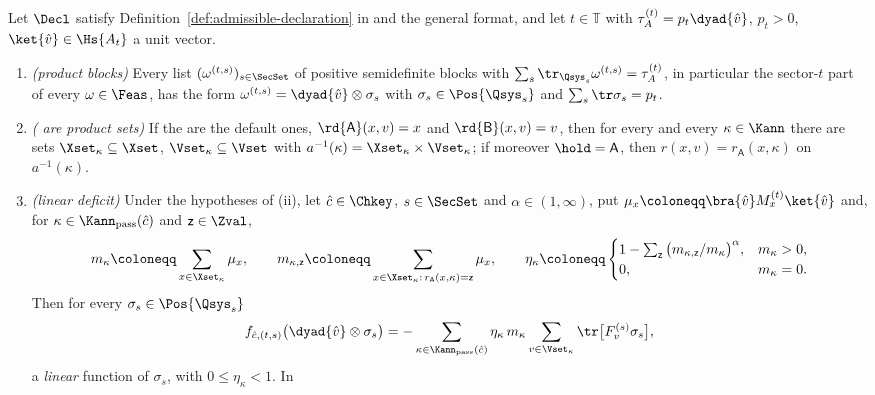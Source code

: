 \begin{lemma}\label{lem:rank-one-sector}
Let $\Decl$ satisfy Definition~\ref{def:admissible-declaration} in 
and the general format, and let $t\in\mathbb{T}$ with
$\tau^{(t)}_A=p_t\dyad{\hat v}$, $p_t>0$, $\ket{\hat v}\in\Hs{A_t}$ a unit
vector.
\begin{enumerate}[label=(\roman*),leftmargin=2.2em]
\item \emph{(product blocks)} Every list $(\omega^{(t,s)})_{s\in\SecSet}$ of
positive semidefinite blocks with
$\sum_s\tr_{\Qsys_s}\omega^{(t,s)}=\tau^{(t)}_A$, in particular the sector-$t$
part of every $\omega\in\Feas$, has the form
$\omega^{(t,s)}=\dyad{\hat v}\otimes\sigma_s$ with
$\sigma_s\in\Pos{\Qsys_s}$ and $\sum_s\tr\sigma_s=p_t$.
\item \emph{( are product sets)} If the
 are the default ones,
$\rd{\mathsf A}(x,v)=x$ and $\rd{\mathsf B}(x,v)=v$, then for
every  and every $\kappa\in\Kann$ there are sets
$\Xset_{\kappa}\subseteq\Xset$, $\Vset_{\kappa}\subseteq\Vset$ with
$a^{-1}(\kappa)=\Xset_{\kappa}\times\Vset_{\kappa}$; if moreover
$\hold=\mathsf A$, then $r(x,v)=r_{\mathsf A}(x,\kappa)$ on $a^{-1}(\kappa)$.
\item \emph{(linear deficit)} Under the hypotheses of (ii), let
$\hat c\in\Chkey$, $s\in\SecSet$ and $\alpha\in(1,\infty)$, put
$\mu_x\coloneqq\bra{\hat v}M^{(t)}_x\ket{\hat v}$ and, for
$\kappa\in\Kann_{\mathrm{pass}}(\hat c)$ and $\mathsf z\in\Zval$,
\begin{equation}\label{eq:rank-one-weights}
  m_{\kappa}\coloneqq\sum_{x\in\Xset_{\kappa}}\mu_x,\qquad
  m_{\kappa,\mathsf z}\coloneqq\sum_{x\in\Xset_{\kappa}:\,
  r_{\mathsf A}(x,\kappa)=\mathsf z}\mu_x,\qquad
  \eta_{\kappa}\coloneqq
  \begin{cases}
   1-\sum_{\mathsf z}\big(m_{\kappa,\mathsf z}/m_{\kappa}\big)^{\alpha},
   & m_{\kappa}>0,\\ 0,& m_{\kappa}=0 .
  \end{cases}
\end{equation}
Then for every $\sigma_s\in\Pos{\Qsys_s}$
\begin{equation}\label{eq:rank-one-deficit}
  f_{\hat c,(t,s)}\big(\dyad{\hat v}\otimes\sigma_s\big)
  =-\sum_{\kappa\in\Kann_{\mathrm{pass}}(\hat c)}\eta_{\kappa}\,m_{\kappa}
  \sum_{v\in\Vset_{\kappa}}\tr\big[F^{(s)}_v\sigma_s\big],
\end{equation}
a \emph{linear} function of $\sigma_s$, with $0\le\eta_{\kappa}<1$. In

\end{enumerate}
\end{lemma}
